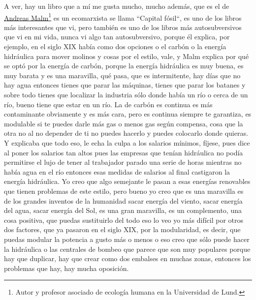 A ver, hay un libro que a mí me gusta mucho, mucho además, que es el de \href{https://en.wikipedia.org/wiki/Andreas_Malm}{Andreas Malm}\footnote{Autor y profesor asociado de ecología humana en la Universidad de Lund.} es un ecomarxista se llama ``Capital fósil``\cite{malm2016english}, es uno de los libros más interesantes que vi, pero también es uno de los libros más autosubversivos que vi en mi vida, nunca vi algo tan autosubversivo, porque él explica, por ejemplo, en el siglo XIX había como dos opciones o el carbón o la energía hidráulica para mover molinos y cosas por el estilo, vale, y Malm explica por qué se optó por la energía de carbón, porque la energía hidráulica es muy buena, es muy barata y es una maravilla, qué pasa, que es intermitente, hay días que no hay agua entonces tienes que parar las máquinas, tienes que parar los batanes y sobre todo tienes que localizar la industria sólo donde había un río o cerca de un río, bueno tiene que estar en un río. La de carbón es continua es más contaminante obviamente y es más cara, pero es continua siempre te garantiza, es modulable si te puedes darle más gas o menos gas según compensa, cosa que la otra no al no depender de ti no puedes hacerlo y puedes colocarlo donde quieras. Y explicaba que todo eso, le echa la culpa a los salarios mínimos, fíjese, pues dice al poner los salarios tan altos pues las empresas que tenían hidráulica no podía permitirse el lujo de tener al trabajador parado una serie de horas mientras no había agua en el río entonces esas medidas de salarios al final castigaron la energía hidráulica. Yo creo que algo semejante le pasan a esas energías renovables que tienen problemas de este estilo, pero bueno yo creo que es una maravilla es de los grandes inventos de la humanidad sacar energía del viento, sacar energía del agua, sacar energía del Sol, es una gran maravilla, es un complemento, una cosa positiva, que puedas sustituirlo del todo eso lo veo yo más difícil por otros dos factores, que ya pasaron en el siglo XIX, por la modularidad, es decir, que puedas modular la potencia a gusto más o menos o eso creo que sólo puede hacer la hidráulica o las centrales de bombeo que parece que son muy populares porque hay que duplicar, hay que crear como dos embalses en muchas zonas, entonces los problemas que hay, hay mucha oposición.

